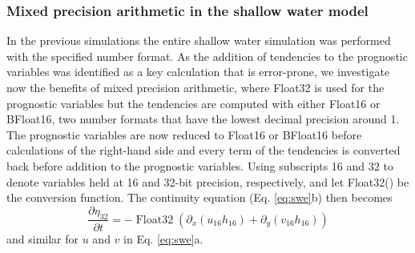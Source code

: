 \documentclass[draft]{agujournal2019}
\newcommand{\op}{\operatorname}
\begin{document}
\subsubsection{Mixed precision arithmetic in the shallow water model}
\label{sec:mixed}

In the previous simulations the entire shallow water simulation was performed
with the specified number format. As the addition of tendencies to the prognostic
variables was identified as a key calculation that is error-prone, we investigate
now the benefits of mixed precision arithmetic, where Float32 is used for the
prognostic variables but the tendencies are computed with either Float16 or
BFloat16, two number formats that have the lowest decimal precision around 1.
The prognostic variables are now reduced to Float16 or BFloat16 before calculations
of the right-hand side and every term of the tendencies is converted back before
addition to the prognostic variables. Using subscripts 16 and 32 to denote variables
held at 16 and 32-bit precision, respectively, and let Float32() be the conversion
function. The continuity equation (Eq. \ref{eq:swe}b) then becomes
\begin{equation}
\frac{\partial \eta_{32}}{\partial t} = -\op{Float32}( \partial_x(u_{16}h_{16})
+ \partial_y(v_{16}h_{16} ))
\label{eq:conversion}
\end{equation}
and similar for $u$ and $v$ in Eq. \ref{eq:swe}a.
\end{document}
